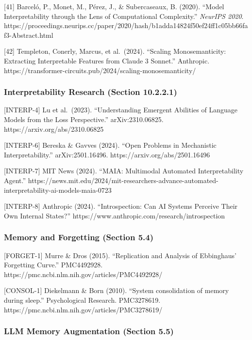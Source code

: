 \documentclass[
]{article}
\begin{document}
{[}41{]} Barceló, P., Monet, M., Pérez, J., \& Subercaseaux, B. (2020).
``Model Interpretability through the Lens of Computational Complexity.''
\emph{NeurIPS 2020}.
https://proceedings.neurips.cc/paper/2020/hash/b1adda14824f50ef24ff1c05bb66faf3-Abstract.html

{[}42{]} Templeton, Conerly, Marcus, et al.~(2024). ``Scaling
Monosemanticity: Extracting Interpretable Features from Claude 3
Sonnet.'' Anthropic.
https://transformer-circuits.pub/2024/scaling-monosemanticity/

\hypertarget{interpretability-research-section-10.2.2.1}{%
\subsubsection{Interpretability Research (Section
10.2.2.1)}\label{interpretability-research-section-10.2.2.1}}

{[}INTERP-4{]} Lu et al.~(2023). ``Understanding Emergent Abilities of
Language Models from the Loss Perspective.'' arXiv:2310.06825.
https://arxiv.org/abs/2310.06825

{[}INTERP-6{]} Bereska \& Gavves (2024). ``Open Problems in Mechanistic
Interpretability.'' arXiv:2501.16496. https://arxiv.org/abs/2501.16496

{[}INTERP-7{]} MIT News (2024). ``MAIA: Multimodal Automated
Interpretability Agent.''
https://news.mit.edu/2024/mit-researchers-advance-automated-interpretability-ai-models-maia-0723

{[}INTERP-8{]} Anthropic (2024). ``Introspection: Can AI Systems
Perceive Their Own Internal States?''
https://www.anthropic.com/research/introspection

\hypertarget{memory-and-forgetting-section-5.4}{%
\subsubsection{Memory and Forgetting (Section
5.4)}\label{memory-and-forgetting-section-5.4}}

{[}FORGET-1{]} Murre \& Dros (2015). ``Replication and Analysis of
Ebbinghaus' Forgetting Curve.'' PMC4492928.
https://pmc.ncbi.nlm.nih.gov/articles/PMC4492928/

{[}CONSOL-1{]} Diekelmann \& Born (2010). ``System consolidation of
memory during sleep.'' Psychological Research. PMC3278619.
https://pmc.ncbi.nlm.nih.gov/articles/PMC3278619/

\hypertarget{llm-memory-augmentation-section-5.5}{%
\subsubsection{LLM Memory Augmentation (Section
5.5)}\label{llm-memory-augmentation-section-5.5}}
\end{document}
